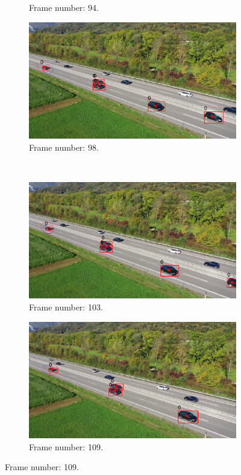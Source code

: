 \begin{figure}[H]
\begin{subfigure}{0.48\textwidth}
        \caption{Frame number: 94.}
        \label{fig:E1-V2-S3:03}
    \end{subfigure}
    \begin{subfigure}{0.48\textwidth}
        \centering
        \includegraphics[width=\linewidth]{../../../experiments/E1/V2/DINO/98}
        \caption{Frame number: 98.}
        \label{fig:E1-V2-S3:04}
    \end{subfigure}
    \\
    \begin{subfigure}{0.48\textwidth}
        \centering
        \includegraphics[width=\linewidth]{../../../experiments/E1/V2/DINO/103}
        \caption{Frame number: 103.}
        \label{fig:E1-V2-S3:05}
    \end{subfigure}
    \begin{subfigure}{0.48\textwidth}
        \centering
        \includegraphics[width=\linewidth]{../../../experiments/E1/V2/DINO/109}
        \caption{Frame number: 109.}
        \label{fig:E1-V2-S3:06}
    \end{subfigure}
\end{figure}
